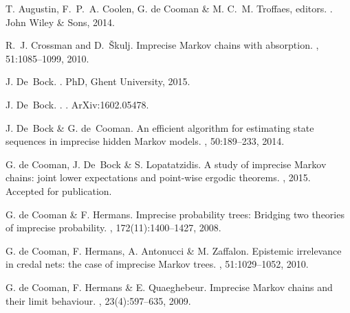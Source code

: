 \documentclass[11pt,dvipsnames,usenames,a4paper]{article}
\begin{document}

\renewcommand\refname{\normalsize Enumerate the bibliographical references that are relevant for your research proposal.}
%
\begin{thebibliography}{10}

T. Augustin, F.~P.~A. Coolen, G. {d}e Cooman \& M. C.~M. Troffaes, editors.
.
\newblock John Wiley \& Sons, 2014.

R.~J. Crossman and D.~\v{S}kulj.
\newblock Imprecise {M}arkov chains with absorption.
, 51:1085--1099,
  2010.

J. De~Bock.
.
\newblock PhD, Ghent University, 2015.

J. De~Bock.
.
.
\newblock ArXiv:1602.05478.

J. De~Bock \& G. de~Cooman.
\newblock An efficient algorithm for estimating state sequences in imprecise
  hidden {M}arkov models.
, 50:189--233, 2014.

G. {d}e Cooman, J. De~Bock \& S. Lopatatzidis.
\newblock A study of imprecise {M}arkov chains: joint lower expectations and
  point-wise ergodic theorems.
, 2015.
\newblock Accepted for publication.

G. {d}e Cooman \& F. Hermans.
\newblock Imprecise probability trees: Bridging two theories of imprecise
  probability.
, 172(11):1400--1427, 2008.

G. {d}e Cooman, F. Hermans, A. Antonucci \& M. Zaffalon.
\newblock Epistemic irrelevance in credal nets: the case of imprecise {M}arkov
  trees.
, 51:1029--1052,
  2010.

G. {d}e Cooman, F. Hermans \& E. Quaeghebeur.
\newblock Imprecise {M}arkov chains and their limit behaviour.
,
  23(4):597--635, 2009.


\end{thebibliography}
\end{document}
